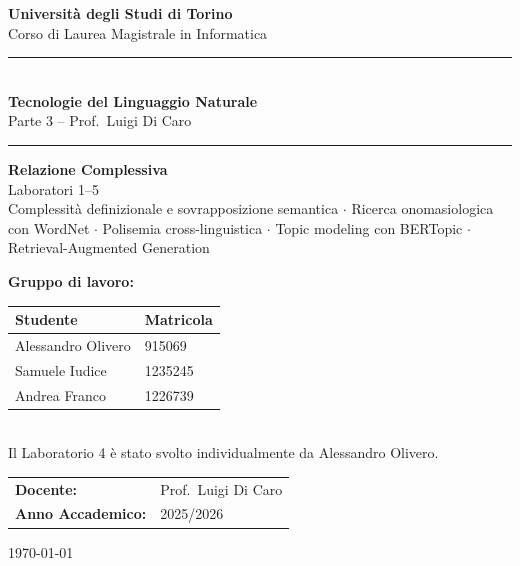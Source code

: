 \documentclass[12pt,a4paper]{article}
\newcommand{\HRule}{\rule{\linewidth}{0.5mm}}
\begin{document}
\raggedbottom

\begin{titlepage}
  \centering
  \vspace*{1.2cm}

  {\Large\textbf{Universit\`a degli Studi di Torino}\\[0.3em]
  Corso di Laurea Magistrale in Informatica}

  \vspace{1cm}
  \HRule\\[0.4em]
  {\LARGE\textbf{Tecnologie del Linguaggio Naturale}}\\[0.3em]
  {\large Parte 3 -- Prof.\ Luigi Di Caro}\\[0.2em]
  \HRule

  \vspace{1.2cm}
  {\huge\textbf{Relazione Complessiva}}\\[0.5em]
  {\LARGE Laboratori 1--5}\\[0.6em]
  {\large
    Complessit\`a definizionale e sovrapposizione semantica
    \;$\cdot$\; Ricerca onomasiologica con WordNet
    \;$\cdot$\; Polisemia cross-linguistica
    \;$\cdot$\; Topic modeling con BERTopic
    \;$\cdot$\; Retrieval-Augmented Generation
  }

  \vspace{2cm}

  {\large\textbf{Gruppo di lavoro:}}\\[0.8em]
  \begin{tabular}{ll}
    \toprule
    \textbf{Studente}    & \textbf{Matricola} \\
    \midrule
    Alessandro Olivero   & 915069  \\
    Samuele Iudice       & 1235245 \\
    Andrea Franco        & 1226739 \\
    \bottomrule
  \end{tabular}\\[0.4em]
  {\footnotesize Il Laboratorio 4 \`e stato svolto individualmente da Alessandro Olivero.}

  \vspace{1.5cm}
  \begin{tabular}{ll}
    \textbf{Docente:}          & Prof.\ Luigi Di Caro \\[0.3em]
    \textbf{Anno Accademico:}  & 2025/2026 \\
  \end{tabular}

  \vfill
  {\large \today}
\end{titlepage}
\end{document}
